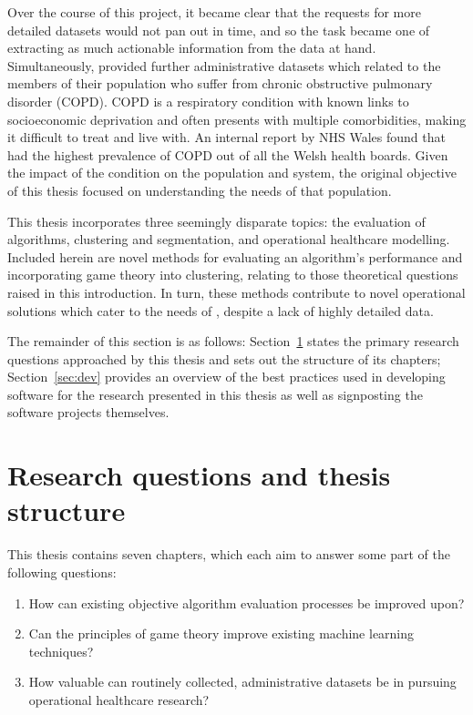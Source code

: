 Over the course of this project, it became clear that the requests for more
detailed datasets would not pan out in time, and so the task became one of
extracting as much actionable information from the data at hand. Simultaneously,
\ctmuhb provided further administrative datasets which related to the members of
their population who suffer from chronic obstructive pulmonary disorder (COPD).
COPD is a respiratory condition with known links to socioeconomic deprivation
and often presents with multiple comorbidities, making it difficult to treat and
live with. An internal report by NHS Wales found that \ctmuhb had the highest
prevalence of COPD out of all the Welsh health boards. Given the impact of the
condition on the population and system, the original objective of this thesis
focused on understanding the needs of that population.

This thesis incorporates three seemingly disparate topics: the evaluation of
algorithms, clustering and segmentation, and operational healthcare modelling.
Included herein are novel methods for evaluating an algorithm's performance and
incorporating game theory into clustering, relating to those theoretical
questions raised in this introduction. In turn, these methods contribute to
novel operational solutions which cater to the needs of \ctmuhb, despite a lack
of highly detailed data.

The remainder of this section is as follows: Section~\ref{sec:questions} states
the primary research questions approached by this thesis and sets out the
structure of its chapters; Section~\ref{sec:dev} provides an overview of the
best practices used in developing software for the research presented in this
thesis as well as signposting the software projects themselves.

\section{Research questions and thesis structure}\label{sec:questions}

This thesis contains seven chapters, which each aim to answer some part of the
following questions:

\begin{enumerate}
    \item How can existing objective algorithm evaluation processes be improved
        upon?
    \item Can the principles of game theory improve existing machine learning
        techniques?
    \item How valuable can routinely collected, administrative datasets be in
        pursuing operational healthcare research?
\end{enumerate}

